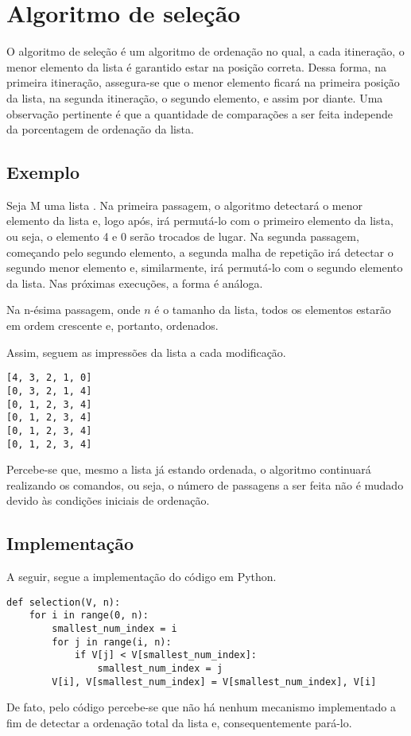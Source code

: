 \section{Algoritmo de seleção}
O algoritmo de seleção é um algoritmo de ordenação no qual, a cada itineração, o menor elemento da lista é garantido estar na posição correta. Dessa forma, na primeira itineração, assegura-se que o menor elemento ficará na primeira posição da lista, na segunda itineração, o segundo elemento, e assim por diante. 
Uma observação pertinente é que a quantidade de comparações a ser feita independe da porcentagem de ordenação da lista.

\subsection{Exemplo}
Seja M uma lista \code{[4,3,2,1,0]}. Na primeira passagem, o algoritmo detectará o menor elemento da lista e, logo após, irá permutá-lo com o primeiro elemento da lista, ou seja, o elemento 4 e 0 serão trocados de lugar. Na segunda passagem, começando pelo segundo elemento, a segunda malha de repetição irá detectar o segundo menor elemento e, similarmente, irá permutá-lo com o segundo elemento da lista. Nas próximas execuções, a forma é análoga.

Na n-ésima passagem, onde $n$ é o tamanho da lista, todos os elementos estarão em ordem crescente e, portanto, ordenados.

Assim, seguem as impressões da lista a cada modificação.

\begin{lstlisting}
[4, 3, 2, 1, 0]
[0, 3, 2, 1, 4]
[0, 1, 2, 3, 4]
[0, 1, 2, 3, 4]
[0, 1, 2, 3, 4]
[0, 1, 2, 3, 4]
\end{lstlisting}

Percebe-se que, mesmo a lista já estando ordenada, o algoritmo continuará realizando os comandos, ou seja, o número de passagens a ser feita não é mudado devido às condições iniciais de ordenação.

\newpage
\subsection{Implementação}
A seguir, segue a implementação do código em Python.

\begin{lstlisting}
def selection(V, n):
    for i in range(0, n):
        smallest_num_index = i
        for j in range(i, n):
            if V[j] < V[smallest_num_index]:
                smallest_num_index = j
        V[i], V[smallest_num_index] = V[smallest_num_index], V[i]

\end{lstlisting}
De fato, pelo código percebe-se que não há nenhum mecanismo implementado a fim de detectar a ordenação total da lista e, consequentemente pará-lo.

